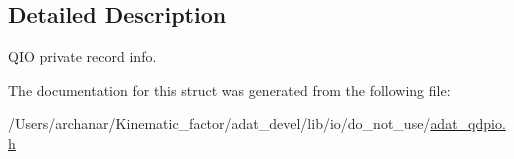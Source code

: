 \subsection{Detailed Description}
Q\+IO private record info. 

The documentation for this struct was generated from the following file\+:\begin{DoxyCompactItemize}
\item 
/\+Users/archanar/\+Kinematic\+\_\+factor/adat\+\_\+devel/lib/io/do\+\_\+not\+\_\+use/\mbox{\hyperlink{adat__qdpio_8h}{adat\+\_\+qdpio.\+h}}\end{DoxyCompactItemize}
